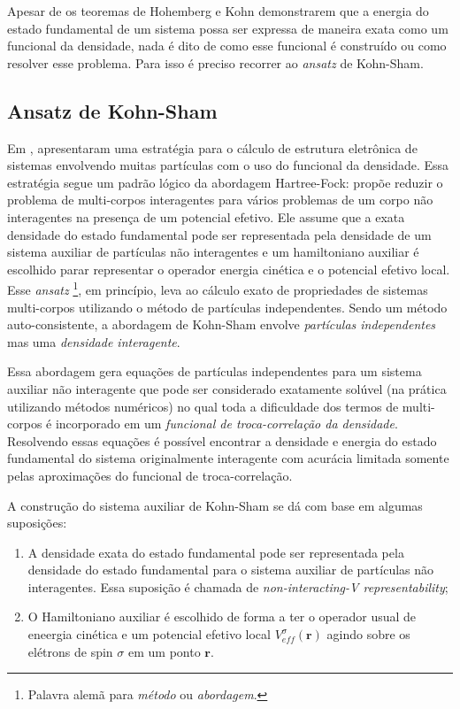 		Apesar de os teoremas de Hohemberg e Kohn demonstrarem que a energia do estado fundamental de um sistema possa ser expressa de maneira exata como um funcional da densidade, nada é dito de como esse funcional é construído ou como resolver esse problema. Para isso é preciso recorrer ao \textit{ansatz} de Kohn-Sham. 
	

	\subsection{Ansatz de Kohn-Sham}
	
	Em \citeyear{kohn1965self},  \cite{kohn1965self} apresentaram uma estratégia para o cálculo de estrutura eletrônica de sistemas envolvendo muitas partículas com o uso do funcional da densidade. Essa estratégia segue um padrão lógico da abordagem Hartree-Fock: propõe reduzir o problema de multi-corpos interagentes para vários problemas de um corpo não interagentes na presença de um potencial efetivo. Ele assume que a exata densidade do estado fundamental pode ser representada pela densidade de um sistema auxiliar de partículas não interagentes e um hamiltoniano auxiliar é escolhido parar representar o operador energia cinética e o potencial efetivo local. Esse \textit{ansatz} \footnote{Palavra alemã para \textit{método} ou \textit{abordagem}.}, em princípio, leva ao cálculo exato de propriedades de sistemas multi-corpos utilizando o método de partículas independentes. Sendo um método auto-consistente, a abordagem de Kohn-Sham envolve \textit{partículas independentes} mas uma \textit{densidade interagente}. 
	
	Essa abordagem gera equações de partículas independentes para um sistema auxiliar não interagente que pode ser considerado exatamente solúvel (na prática utilizando métodos numéricos) no qual toda a dificuldade dos termos de multi-corpos é incorporado em um \textit{funcional de troca-correlação da densidade}. Resolvendo essas equações é possível encontrar a densidade e energia do estado fundamental do sistema originalmente interagente com acurácia limitada somente pelas aproximações do funcional de troca-correlação. 
	
	A construção do sistema auxiliar de Kohn-Sham se dá com base em algumas suposições:
	
	\begin{enumerate}
		\item A densidade exata do estado fundamental pode ser representada pela densidade do estado fundamental para o sistema auxiliar de partículas não interagentes. Essa suposição é chamada de \textit{non-interacting-V representability};
		\item  O Hamiltoniano auxiliar é escolhido de forma a ter o operador usual de eneergia cinética e um potencial efetivo local $V_{eff}^\sigma(\textbf{r})$ agindo sobre os elétrons de spin $\sigma$ em um ponto $\textbf{r}$. 
	\end{enumerate}

